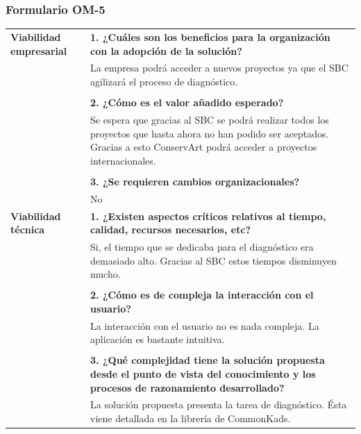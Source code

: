 \documentclass[a4paper,11pt]{article}
\begin{document}
			\subsubsection{Formulario OM-5}
			\begin{center}
				\begin{tabular}{| p{4.5cm} | p{7cm} |}
					\hline
					\textbf{Viabilidad empresarial} & 
					\textbf{1. ¿Cuáles son los beneficios para la organización con la adopción
					de la solución?}\\
					& La empresa podrá acceder a nuevos proyectos ya que el
					SBC agilizará el proceso de diagnóstico.\\
					& \\
					& \textbf{2. ¿Cómo es el valor añadido esperado?}\\
					& Se espera que gracias al SBC se podrá realizar todos los proyectos que
					hasta ahora no han podido ser aceptados. Gracias a esto ConservArt podrá acceder a proyectos internacionales.\\
					& \\
					& \textbf{3. ¿Se requieren cambios organizacionales?}\\
					& No\\
					\hline
					\textbf{Viabilidad técnica} & 
					\textbf{1. ¿Existen aspectos críticos relativos al tiempo, calidad,
					recursos necesarios, etc?}\\
					& Si, el tiempo que se dedicaba para el diagnóstico era demasiado alto.
					Gracias al SBC estos tiempos disminuyen mucho.\\
					& \\
					& \textbf{2. ¿Cómo es de compleja la interacción con el usuario?}\\
					& La interacción con el usuario no es nada compleja. La aplicación es
					bastante intuitiva.\\
					& \\
					& \textbf{3. ¿Qué complejidad tiene la solución propuesta desde el punto de
					vista del conocimiento y los procesos de razonamiento desarrollado?}\\
					& La solución propuesta presenta la tarea de diagnóstico.
					Ésta viene detallada en la librería de CommonKads.\\
					\hline
				\end{tabular}
			\end{center}
			\newpage
\end{document}
